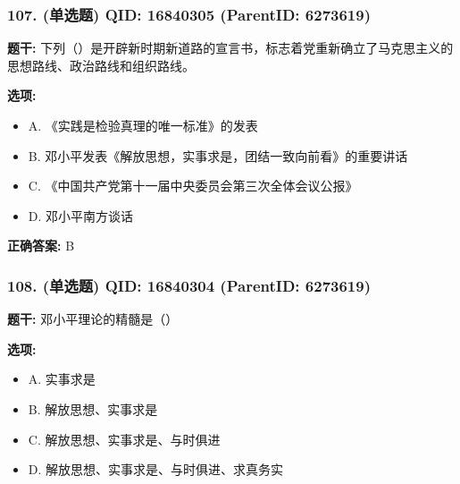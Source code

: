 \documentclass[12pt,UTF8]{ctexart}
\begin{document}
\vspace{0.3em}\hrulefill\vspace{0.7em}

\subsubsection*{107. (单选题) \small QID: 16840305 (ParentID: 6273619)}

\textbf{题干:}
下列（）是开辟新时期新道路的宣言书，标志着党重新确立了马克思主义的思想路线、政治路线和组织路线。



\textbf{选项:}
\begin{itemize}[leftmargin=*]

  \item A. 《实践是检验真理的唯一标准》的发表

  \item B. 邓小平发表《解放思想，实事求是，团结一致向前看》的重要讲话

  \item C. 《中国共产党第十一届中央委员会第三次全体会议公报》

  \item D. 邓小平南方谈话

\end{itemize}

\textbf{正确答案:}
B

\vspace{0.3em}\hrulefill\vspace{0.7em}

\subsubsection*{108. (单选题) \small QID: 16840304 (ParentID: 6273619)}

\textbf{题干:}
邓小平理论的精髓是（）



\textbf{选项:}
\begin{itemize}[leftmargin=*]

  \item A. 实事求是

  \item B. 解放思想、实事求是

  \item C. 解放思想、实事求是、与时俱进

  \item D. 解放思想、实事求是、与时俱进、求真务实

\end{itemize}
\end{document}
